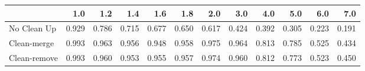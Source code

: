 \begin{tabular}{lrrrrrrrrrrr}
\toprule
{} &   1.0 &   1.2 &   1.4 &   1.6 &   1.8 &   2.0 &   3.0 &   4.0 &   5.0 &   6.0 &   7.0 \\
\midrule
No Clean Up  & 0.929 & 0.786 & 0.715 & 0.677 & 0.650 & 0.617 & 0.424 & 0.392 & 0.305 & 0.223 & 0.191 \\
Clean-merge  & 0.993 & 0.963 & 0.956 & 0.948 & 0.958 & 0.975 & 0.964 & 0.813 & 0.785 & 0.525 & 0.434 \\
Clean-remove & 0.993 & 0.960 & 0.953 & 0.955 & 0.957 & 0.974 & 0.960 & 0.812 & 0.773 & 0.523 & 0.450 \\
\bottomrule
\end{tabular}
